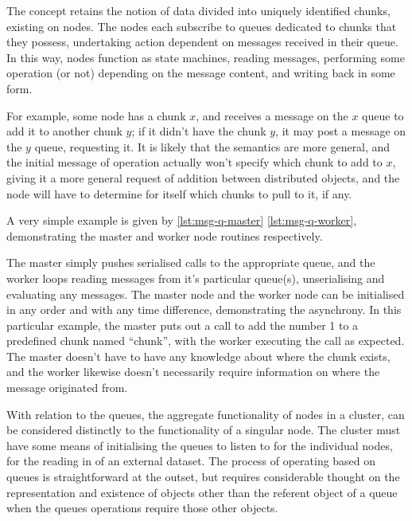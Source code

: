 The concept retains the notion of data divided into uniquely identified
chunks, existing on nodes. The nodes each subscribe to queues dedicated
to chunks that they possess, undertaking action dependent on messages
received in their queue. In this way, nodes function as state machines,
reading messages, performing some operation (or not) depending on the
message content, and writing back in some form.

For example, some node has a chunk \(x\), and receives a message on the
\(x\) queue to add it to another chunk \(y\); if it didn't have the
chunk \(y\), it may post a message on the \(y\) queue, requesting it. It
is likely that the semantics are more general, and the initial message
of operation actually won't specify which chunk to add to \(x\), giving
it a more general request of addition between distributed objects, and
the node will have to determine for itself which chunks to pull to it,
if any.

A very simple example is given by \cref{lst:msg-q-master}
\cref{lst:msg-q-worker}, demonstrating the master and worker node routines
respectively.



The master simply pushes serialised calls to the appropriate queue, and
the worker loops reading messages from it's particular queue(s),
unserialising and evaluating any messages. The master node and the
worker node can be initialised in any order and with any time
difference, demonstrating the asynchrony. In this particular example,
the master puts out a call to add the number 1 to a predefined chunk
named ``chunk'', with the worker executing the call as expected. The
master doesn't have to have any knowledge about where the chunk exists,
and the worker likewise doesn't necessarily require information on where
the message originated from.

With relation to the queues, the aggregate functionality of nodes in a
cluster, can be considered distinctly to the functionality of a singular
node. The cluster must have some means of initialising the queues to
listen to for the individual nodes, for the reading in of an external
dataset. The process of operating based on queues is straightforward at
the outset, but requires considerable thought on the representation and
existence of objects other than the referent object of a queue when the
queues operations require those other objects.

